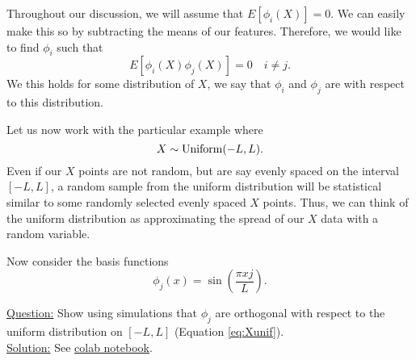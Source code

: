 Throughout our discussion, we will assume that $E[\phi_i(X)]=0$. We can easily make this so by subtracting the means of our features. Therefore, we would like to find $\phi_i$ such that 
\begin{equation}\label{eq:orth}
E[\phi_i(X)\phi_j(X)] = 0 \quad i\ne j.
\end{equation}
We this holds for some distribution of $X$, we say that $\phi_i$ and $\phi_j$ are  with respect to this distribution.



\begin{example}\label{ex:sin}

Let us now work with the particular example where 
\begin{equation}\label{eq:Xunif}
X \sim {\rm Uniform}(-L,L).
\end{equation}
Even if our $X$ points are not random, but are say evenly spaced on the interval $[-L,L]$, a random sample from the uniform distribution will be statistical similar to some randomly selected evenly spaced $X$ points. Thus, we can think of the uniform distribution as approximating the spread of our $X$ data with a random variable. 

Now consider the basis functions 
\begin{equation*}
\phi_j(x) = \sin\left(\frac{\pi x j}{L} \right).
\end{equation*}

 


\noindent
\underline{Question:} Show using simulations that $\phi_j$ are orthogonal with respect to the uniform distribution on $[-L,L]$ (Equation \ref{eq:Xunif}). \\


\noindent
\underline{Solution:}  See \href{https://colab.research.google.com/drive/1EYcMviowfsnsVe7vsUKlyzkNsddUiTau?usp=sharing}{colab notebook}.

\end{example}


